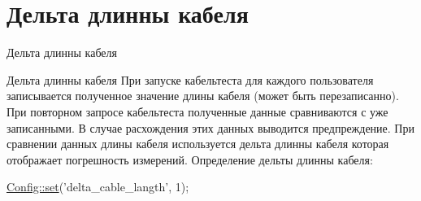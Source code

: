 \hypertarget{group__cable__length}{\section{Дельта длинны кабеля}
\label{group__cable__length}
}


Дельта длинны кабеля  


Дельта длинны кабеля При запуске кабельтеста для каждого пользователя записывается полученное значение длины кабеля (может быть перезаписанно). При повторном запросе кабельтеста полученные данные сравниваются с уже записанными. В случае расхождения этих данных выводится предпреждение. При сравнении данных длины кабеля используется дельта длинны кабеля которая отображает погрешность измерений. Определение дельты длинны кабеля\-: 
\begin{DoxyCode}
\hyperlink{class_config_aa485369b2925858d92e468d405bd0798}{Config::set}(\textcolor{stringliteral}{'delta\_cable\_langth'}, 1);
\end{DoxyCode}
 